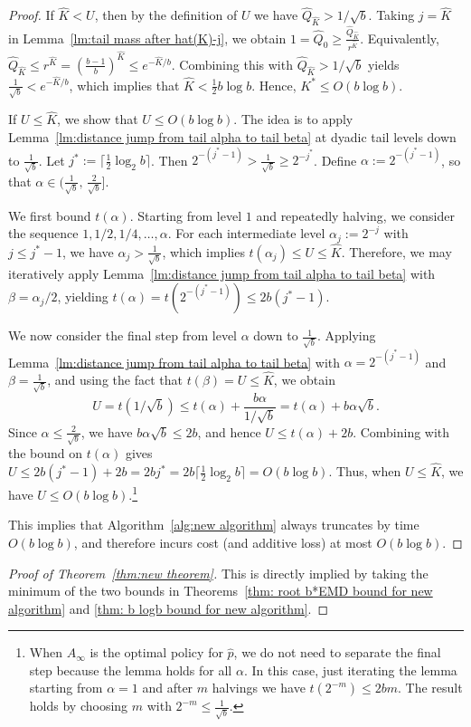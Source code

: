 \begin{proof}
    If $\hat K < U$, then by the definition of $U$ we have $\hat Q_{\hat K} > 1/\sqrt b$. Taking $j=\hat K$ in Lemma~\ref{lm:tail mass after hat(K)-j}, we obtain $1=\hat Q_0 \ge \frac{\hat Q_{\hat K}}{r^{\hat K}}$. Equivalently, $\hat Q_{\hat K} \le r^{\hat K} = \left(\frac{b-1}{b}\right)^{\hat K} \le e^{-\hat K/b}$.
    Combining this with $\hat Q_{\hat K} > 1/\sqrt b$ yields $\frac{1}{\sqrt b} < e^{-\hat K/b}$, which implies that $\hat K < \tfrac{1}{2} b \log b$. Hence, $K^* \le O(b\log b)$.

    If $U\le \hat K$, we show that $U\le O(b\log b)$.
    The idea is to apply Lemma~\ref{lm:distance jump from tail alpha to tail beta} at dyadic tail levels down to $\frac{1}{\sqrt{b}}$.
    Let $j^*:=\lceil \tfrac{1}{2}\log_2 b\rceil$.
    Then $2^{-(j^*-1)}>\frac{1}{\sqrt{b}} \ge 2^{-j^*}$.
    Define $\alpha:=2^{-(j^*-1)}$, so that $\alpha\in(\frac{1}{\sqrt{b}},\,\frac{2}{\sqrt{b}}]$.
    
    We first bound $t(\alpha)$.
    Starting from level $1$ and repeatedly halving, we consider the sequence $1,1/2,1/4,\dots,\alpha$.
    For each intermediate level $\alpha_j:=2^{-j}$ with $j\le j^*-1$, we have $\alpha_j>\frac{1}{\sqrt{b}}$, which implies $t(\alpha_j)\le U\le \hat K$.
    Therefore, we may iteratively apply Lemma~\ref{lm:distance jump from tail alpha to tail beta} with $\beta=\alpha_j/2$, yielding
    $t(\alpha)=t(2^{-(j^*-1)})\le 2b(j^*-1)$.
    
    We now consider the final step from level $\alpha$ down to $\frac{1}{\sqrt{b}}$.
    Applying Lemma~\ref{lm:distance jump from tail alpha to tail beta} with $\alpha=2^{-(j^*-1)}$ and $\beta=\frac{1}{\sqrt{b}}$, and using the fact that $t(\beta)=U\le \hat K$, we obtain
    $$U=t(1/\sqrt{b})\le t(\alpha)+ \frac{b\alpha}{1/\sqrt{b}}=t(\alpha)+b\alpha\sqrt b.$$
    Since $\alpha\le \frac{2}{\sqrt{b}}$, we have $b\alpha\sqrt b\le 2b$, and hence
    $U\le t(\alpha)+2b$.
    Combining with the bound on $t(\alpha)$ gives
    $U\le 2b(j^*-1)+2b=2bj^* = 2b\lceil \tfrac{1}{2}\log_2 b\rceil = O(b\log b)$.
    Thus, when $U\le \hat K$, we have $U\le O(b\log b)$.\footnote{When $A_\infty$ is the optimal policy for $\hat{p}$, we do not need to separate the final step because the lemma holds for all $\alpha$. In this case, just iterating the lemma starting from $\alpha=1$ and after $m$ halvings we have $t(2^{-m}) \leq 2bm$. The result holds by choosing $m$ with $2^{-m} \leq 
    \frac{1}{\sqrt{b}}$.}
    
    This implies that Algorithm~\ref{alg:new algorithm} always truncates by time $O(b\log b)$, and therefore incurs cost (and additive loss) at most $O(b\log b)$.
\end{proof}


\begin{proof}[Proof of Theorem~\ref{thm:new theorem}]
This is directly implied by taking the minimum of the two bounds in Theorems~\ref{thm: root b*EMD bound for new algorithm} and \ref{thm: b logb bound for new algorithm}.
\end{proof}
